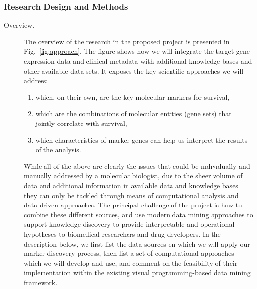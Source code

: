 \documentclass[11pt,a4paper]{article}
\begin{document}
\subsubsection{Research Design and Methods}
\begin{description}
	\item[Overview.]
The overview of the research in the proposed project is presented in Fig.~\ref{fig:approach}. The figure shows how we will integrate the target gene expression data and clinical metadata with additional knowledge bases and other available data sets. It exposes the key scientific approaches we will address:
\begin{enumerate}
\item which, on their own, are the key molecular markers for survival,
\item which are the combinations of molecular entities (gene sets) that jointly correlate with survival,
\item which characteristics of marker genes can help us interpret the results of the analysis.
\end{enumerate}
While all of the above are clearly the issues that could be individually and manually addressed by a molecular biologist, due to the sheer volume of data and additional information in available data and knowledge bases they can only be tackled through means of computational analysis and data-driven approaches. The principal challenge of the project is how to combine these different sources, and use modern data mining approaches to support knowledge discovery to provide interpretable and operational hypotheses to biomedical researchers and drug developers. In the description below, we first list the data sources on which we will apply our marker discovery process, then list a set of computational approaches which we will develop and use, and comment on the feasibility of their implementation within the existing visual programming-based data mining framework.


\end{description}
\end{document}

